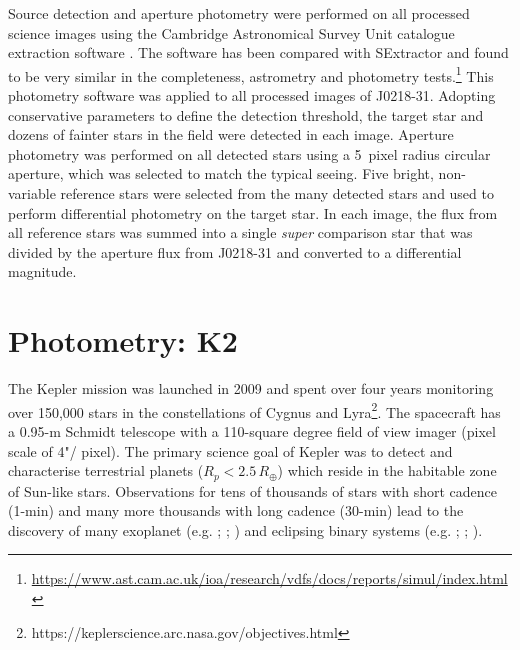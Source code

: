 Source detection and aperture photometry were performed on all processed science images using the Cambridge Astronomical Survey Unit catalogue extraction software \citep{2001NewAR..45..105I}. The  software  has  been  compared  with  SExtractor \citep{1996A26AS..117..393B} and found to be very similar in the completeness, astrometry and photometry tests.\footnote{\url{https://www.ast.cam.ac.uk/ioa/research/vdfs/docs/reports/simul/index.html}} This photometry software was applied to all processed images of J0218-31.  Adopting conservative parameters to define the detection threshold, the target star and dozens of fainter stars in the field were detected in each image.  Aperture photometry was performed on all detected stars using a 5~pixel radius circular aperture, which was selected to match the typical seeing. Five bright, non-variable reference stars were selected from the many detected stars and used to perform differential photometry on the target star.  In each image, the flux from all reference stars was summed into a single \textit{super} comparison star that was divided by the aperture flux from J0218-31 and converted to a differential magnitude.

\section{Photometry: K2}

The Kepler mission was launched in 2009 and spent over four years monitoring over 150,000 stars in the constellations of Cygnus and Lyra\footnote{https://keplerscience.arc.nasa.gov/objectives.html}. The spacecraft has a 0.95-m Schmidt telescope
with a 110-square degree field of view imager (pixel scale of 4"/ pixel). The primary science goal of Kepler was to detect and characterise terrestrial planets ($R_p < 2.5\,R_{\oplus}$) which reside in the habitable zone of Sun-like stars. Observations for tens of thousands of stars with short cadence (1-min) and many more thousands with long cadence (30-min) lead to the discovery of many exoplanet (e.g. \citealt{2013ApJ...768...14W}; \citealt{2012ApJ...747..144M}; \citealt{2013ApJ...777....3N}) and eclipsing binary systems (e.g. \citealt{2011Sci...331..562C}; \citealt{2011ApJS..197....4W}; \citealt{2011ApJ...736L...4S}). 

